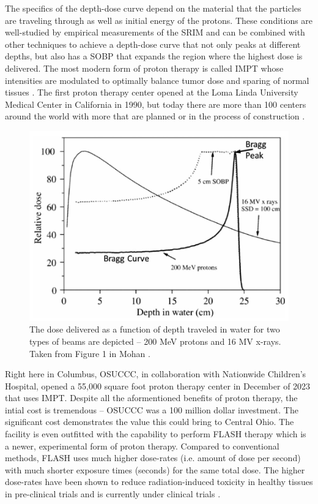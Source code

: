 The specifics of the depth-dose curve depend on the material that the particles are traveling through as well as initial energy of the protons. These conditions are well-studied by empirical measurements of the \gls{SRIM} \cite{Ziegler_2010_SRIM} and can be combined with other techniques to achieve a depth-dose curve that not only peaks at different depths, but also has a \gls{SOBP} that expands the region where the highest dose is delivered. The most modern form of proton therapy is called \gls{IMPT} whose intensities are modulated to optimally balance tumor dose and sparing of normal tissues \cite{Mohan_2022_PRO}. The first proton therapy center opened at the Loma Linda University Medical Center in California in 1990, but today there are more than 100 centers around the world with more that are planned or in the process of construction \cite{Mohan_2022_PRO}. 

\begin{figure}
	\centering
	\includegraphics[width=0.75\linewidth]{planning/images/bragg_curve.PNG}
	\caption{The dose delivered as a function of depth traveled in water for two types of beams are depicted -- 200 MeV protons and 16 MV x-rays. Taken from Figure 1 in Mohan \cite{Mohan_2022_PRO}.}
	\label{fig:bragg_curve}
\end{figure}
 
Right here in Columbus, \gls{OSUCCC}, in collaboration with Nationwide Children's Hospital, opened a 55,000 square foot proton therapy center in December of 2023 \cite{OSU_CCC} that uses \gls{IMPT}. Despite all the aformentioned benefits of proton therapy, the intial cost is tremendous -- \gls{OSUCCC} was a 100 million dollar investment. The significant cost demonstrates the value this could bring to Central Ohio. The facility is even outfitted with the capability to perform FLASH therapy which is a newer, experimental form of proton therapy. Compared to conventional methods, FLASH uses much higher dose-rates (i.e. amount of dose per second) with much shorter exposure times (seconds) for the same total dose. The higher dose-rates have been shown to reduce radiation-induced toxicity in healthy tissues in pre-clinical trials \cite{Matuszak_2022_Onc} and is currently under clinical trials \cite{OSU_CCC}. 

